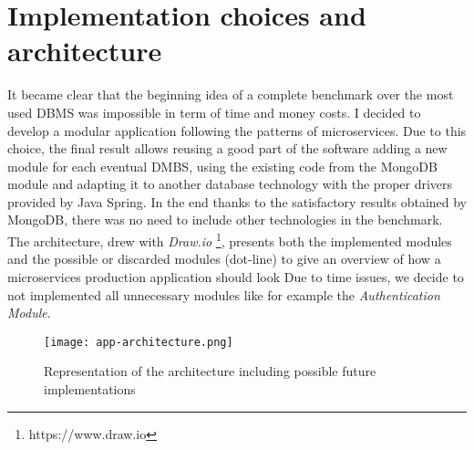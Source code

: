 \section{Implementation choices and architecture}
\label{sec:2}
It became clear that the beginning idea of a complete benchmark over the most used DBMS was impossible in term of time and money costs.
I decided to develop a modular application following the patterns of microservices. Due to this choice, the final result allows reusing a good part of the software  adding a new module for each eventual DMBS, using the existing code from the MongoDB module and adapting it to another database technology with the proper drivers provided by Java Spring.
In the end thanks to the satisfactory results obtained by MongoDB, there was no need to include other technologies in the benchmark.
The architecture, drew with \textit{Draw.io} \footnote{https://www.draw.io}, presents  both the implemented modules and the possible or discarded modules (dot-line) to give an overview of how a microservices production application should look
Due to time issues, we decide to not implemented all unnecessary modules like for example the \textit{Authentication Module}.
\begin{figure}
\texttt{[image: app-architecture.png]}
\centering
\caption{Representation of the architecture including possible future implementations}
\end{figure}



